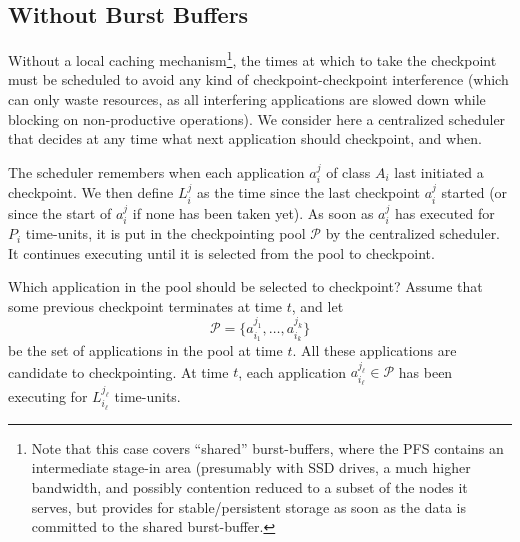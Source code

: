 \documentclass[conference]{IEEEtran}
\newcommand{\app}[1]{A_{#1}}
\newcommand{\application}[2]{a_{#1}^{#2}}
\newcommand{\lastckpt}[2]{L_{#1}^{#2}}
\newcommand{\pool}{{\mathcal P}}
\begin{document}



\subsection{Without Burst Buffers}

Without a local caching mechanism\footnote{Note that this case covers ``shared'' burst-buffers, where the
PFS contains an intermediate stage-in area (presumably with SSD drives, a much higher bandwidth, and possibly contention reduced to a subset of the nodes it serves, but provides for stable/persistent storage as soon as the data is committed to the shared burst-buffer.}, the times at which to take the checkpoint
must be scheduled to avoid any kind of checkpoint-checkpoint
interference (which can only waste resources, as all interfering
applications are slowed down while blocking on non-productive
operations). We consider here a centralized scheduler that decides at
any time what next application should checkpoint, and when.

The scheduler remembers when each application $\application{i}{j}$ of class
$\app{i}$ last initiated a checkpoint. We then define $\lastckpt{i}{j}$
as the time since the last checkpoint $\application{i}{j}$ started
(or since the start of $\application{i}{j}$ if none has been taken yet).
As soon as $\application{i}{j}$ has executed for $P_{i}$ time-units,
it is put in the checkpointing pool $\pool$ by the centralized scheduler. It
continues executing until it is selected from the pool to checkpoint.

Which application in the pool should be selected to checkpoint?
Assume that some previous checkpoint terminates at time $t$,
and let
$$\pool = \{ \application{i_{1}}{j_{1}}, \dots, \application{i_{k}}{j_{k}} \}$$
be the set of applications  in the pool at time $t$. All these applications are
candidate to checkpointing. At time $t$, each application $\application{i_{\ell}}{j_{\ell}} \in \pool$
has been executing for  $\lastckpt{i_{\ell}}{j_{\ell}}$ time-units.
\end{document}
